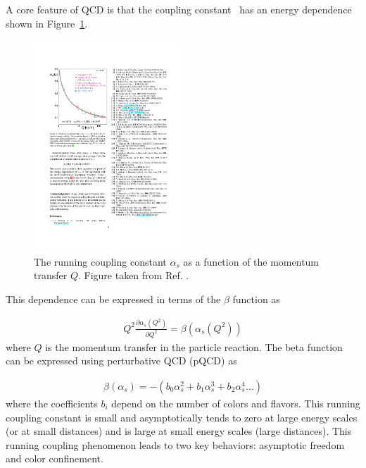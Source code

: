 A core feature of QCD is that the coupling constant \alphas\ has an energy dependence shown in Figure~\ref{fig:running_coupling}. 

\begin{figure}[htbp]
\begin{center}
\includegraphics[width=0.5\textwidth]{figures/theory/running_coupling}
\caption{The running coupling constant $\alpha_s$ as a function of the momentum transfer $Q$. Figure taken from Ref. \cite{Beringer:1481544}. }
\label{fig:running_coupling}
\end{center}
\end{figure}

This dependence can be expressed in terms of the $\beta$ function as

\begin{align}
Q^2 \frac{\partial \alpha_s (Q^2)}{\partial Q^2} = \beta(\alpha_s (Q^2))
\end{align}
where $Q$ is the momentum transfer in the particle reaction. The beta function can be expressed using perturbative QCD (pQCD) as

\begin{align}
\beta( \alpha_s ) = - (b_0 \alpha_s^2 + b_1 \alpha_s^3 + b_2 \alpha_s^4... )
\end{align}
where the coefficients $b_i$ depend on the number of colors and flavors. This running coupling constant is small and asymptotically tends
to zero at large energy scales (or at small distances) and is large at small energy scales (large distances). This running coupling phenomenon
leads to two key behaviors: asymptotic freedom and color confinement. 


